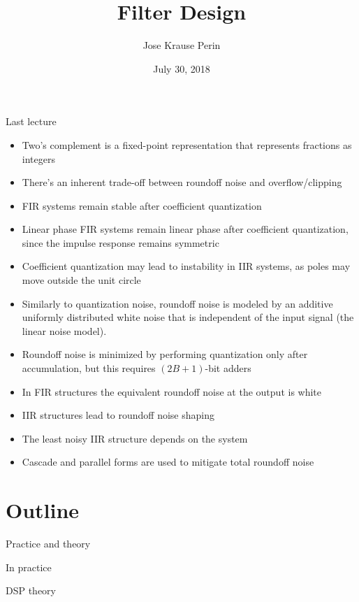 \documentclass[10pt, aspectratio=169]{beamer}
\title[EE 264]{Filter Design}
\author{Jose Krause Perin}
\institute{Stanford University}
\date{July 30, 2018}
\begin{document}
\begin{frame}
  \titlepage
\end{frame}

%
\begin{frame}{Last lecture}
\begin{itemize}
	\item Two's complement is a fixed-point representation that represents fractions as integers
	\item There's an inherent trade-off between roundoff noise and overflow/clipping
	\item FIR systems remain stable after coefficient quantization
	\item Linear phase FIR systems remain linear phase after coefficient quantization, since the impulse response remains symmetric
	\item Coefficient quantization may lead to instability in IIR systems, as poles may move outside the unit circle
	\item Similarly to quantization noise, roundoff noise is modeled by an additive uniformly distributed white noise that is independent of the input signal (the linear noise model).
	\item Roundoff noise is minimized by performing quantization only after accumulation, but this requires $(2B+1)$-bit adders
	\item In FIR structures the equivalent roundoff noise at the output is white
	\item IIR structures lead to roundoff noise shaping
	\item The least noisy IIR structure depends on the system
	\item Cascade and parallel forms are used to mitigate total roundoff noise
\end{itemize}
\end{frame}

%
\section{Outline}

\begin{frame}{Practice and theory}
\begin{block}{In practice}
	\vspace{-0.5cm}
	\begin{center}
		\resizebox{0.8\linewidth}{!}{}
	\end{center}
\end{block}

\begin{block}{DSP theory}
	\vspace{-0.5cm}
	\begin{center}
		\def\Heff{1}
		\resizebox{0.8\linewidth}{!}{}
	\end{center}
\end{block}

\end{frame}
\end{document}
